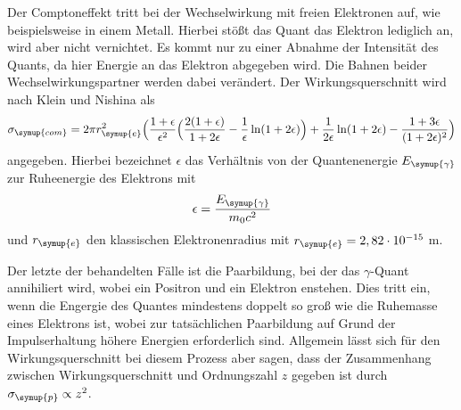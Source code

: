 Der Comptoneffekt tritt bei der Wechselwirkung mit freien Elektronen auf, wie beispielsweise in einem Metall. Hierbei stößt das Quant das Elektron lediglich an,
wird aber nicht vernichtet. Es kommt nur zu einer Abnahme der Intensität des Quants, da hier Energie an das Elektron abgegeben wird. Die Bahnen
beider Wechselwirkungspartner werden dabei verändert. Der Wirkungsquerschnitt wird nach Klein und Nishina als 
\begin{equation}
    \label{eqn:wirkung_comp}
    \sigma_{\symup{com}} = 2 \pi r_{\symup{e}}^2 \Bigl(\frac{1 + \epsilon}{\epsilon^2} \Bigl( \frac{2(1 + \epsilon)}{1+ 2 \epsilon} - \frac{1}{\epsilon} \ln(1 + 2 \epsilon)  \Bigr ) + \frac{1}{2 \epsilon} \ln(1 + 2 \epsilon)  - \frac{1 + 3 \epsilon}{(1 + 2 \epsilon)^2} \Bigr )
\end{equation}    
angegeben. Hierbei bezeichnet $\epsilon$ das Verhältnis von der Quantenenergie $E_{\symup{\gamma}}$ zur Ruheenergie des Elektrons mit 
\begin{equation}
    \label{eqn:epsilon}
    \epsilon = \frac{E_{\symup{\gamma}}}{m_0 c^2}
\end{equation}    
und $r_{\symup{e}}$ den klassischen Elektronenradius mit $r_{\symup{e}} = 2,82 \cdot 10^{-15}$ m.

Der letzte der behandelten Fälle ist die Paarbildung, bei der das $\gamma$-Quant annihiliert wird, wobei ein Positron und ein Elektron enstehen.
Dies tritt ein, wenn die Engergie des Quantes mindestens doppelt so groß wie die Ruhemasse eines Elektrons ist, wobei zur tatsächlichen 
Paarbildung auf Grund der Impulserhaltung höhere Energien erforderlich sind. Allgemein lässt sich für den Wirkungsquerschnitt bei diesem
Prozess aber sagen, dass der Zusammenhang zwischen Wirkungsquerschnitt und Ordnungszahl $z$ gegeben ist durch $ \sigma_{\symup{p}} \propto z^2$.

